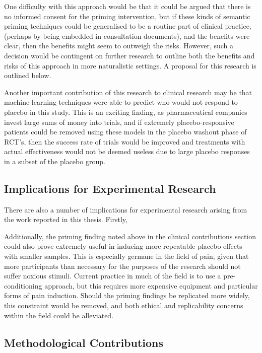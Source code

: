 One difficulty with this approach would be that it could be argued that there is no informed consent for the priming intervention, but if these kinds of semantic priming techniques could be generalised to be a routine part of clinical practice, (perhaps by being embedded in consultation documents), and the benefits were clear, then the benefits might seem to outweigh the risks. However, such a decision would be contingent on further research to outline both the benefits and risks of this approach in more naturalistic settings. A proposal for this research is outlined below.

Another important contribution of this research to clinical research may be that machine learning techniques were able to predict who would not respond to placebo in this study. This is an exciting finding, as pharmaceutical companies invest large sums of money into trials, and if extremely placebo-responsive patients could be removed using these models in the placebo washout phase of RCT's, then the success rate of trials would be improved and treatments with actual effectiveness would not be deemed useless due to large placebo responses in a subset of the placebo group. 

\subsection{Implications for Experimental Research}
\label{sec:impl-exper-rese}

There are also a number of implications for experimental research arising from the work reported in this thesis. Firstly, 

Additionally, the priming finding noted above in the clinical contributions section could also prove extremely useful in inducing more repeatable placebo effects with smaller samples. This is especially germane in the field of pain, given that more participants than necessary for the purposes of the research should not suffer noxious stimuli. Current practice in much of the field is to use a pre-conditioning approach, but this requires more expensive equipment and particular forms of pain induction. Should the priming findings be replicated more widely, this constraint would be removed, and both ethical and replicability concerns within the field could be alleviated. 



\subsection{Methodological Contributions}
\label{sec:meth-contr}

